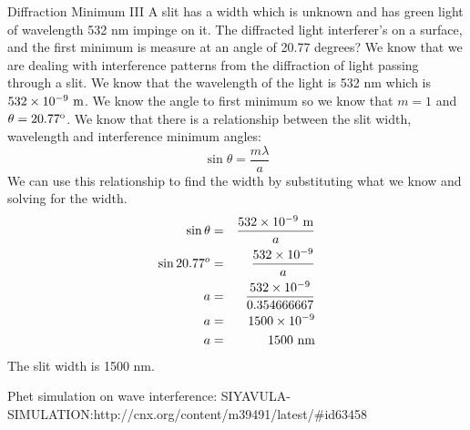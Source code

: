 \begin{wex}{Diffraction Minimum III}
{A slit has a width which is unknown and has green light of wavelength 532 nm impinge on it. The diffracted light interferer's on a surface, and the first minimum is measure at an angle of 20.77 degrees? }
{
We know that we are dealing with interference patterns from the diffraction of light passing through a slit. We know that the wavelength of the light is 532 nm which is $532 \times 10^{-9}\ \rm{m}$. We know the angle to first minimum so we know that $m=1$ and $\theta = 20.77^{\rm{o}}$.
We know that there is a relationship between the slit width, wavelength and interference minimum angles:
\begin{equation*}
\sin\theta = \frac{m\lambda}{a}
\end{equation*}
We can use this relationship to find the width by substituting what we know and solving for the width.
\begin{eqnarray*}
\sin\theta &=& \frac{532\times 10^{-9} \ \rm{m}}{a} \\
\sin 20.77^{o} &=& \frac{532\times 10^{-9}}{a} \\
a &=& \frac{532\times 10^{-9}}{0.354666667}  \\
a & = & 1500 \times 10^{-9} \\
a & = & 1500\  \rm{nm} \\
\end{eqnarray*}
The slit width is 1500 nm.
}
\end{wex}
Phet simulation on wave interference: SIYAVULA-SIMULATION:http://cnx.org/content/m39491/latest/#id63458







